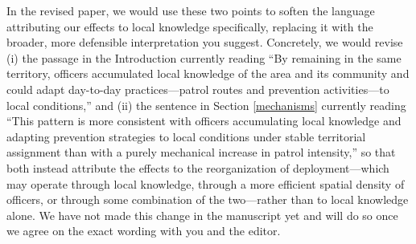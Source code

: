 In the revised paper, we would use these two points to soften the language attributing our effects to local knowledge specifically, replacing it with the broader, more defensible interpretation you suggest. Concretely, we would revise (i) the passage in the Introduction currently reading ``By remaining in the same territory, officers accumulated local knowledge of the area and its community and could adapt day-to-day practices---patrol routes and prevention activities---to local conditions,'' and (ii) the sentence in Section \ref{mechanisms} currently reading ``This pattern is more consistent with officers accumulating local knowledge and adapting prevention strategies to local conditions under stable territorial assignment than with a purely mechanical increase in patrol intensity,'' so that both instead attribute the effects to the reorganization of deployment---which may operate through local knowledge, through a more efficient spatial density of officers, or through some combination of the two---rather than to local knowledge alone. We have not made this change in the manuscript yet and will do so once we agree on the exact wording with you and the editor.





